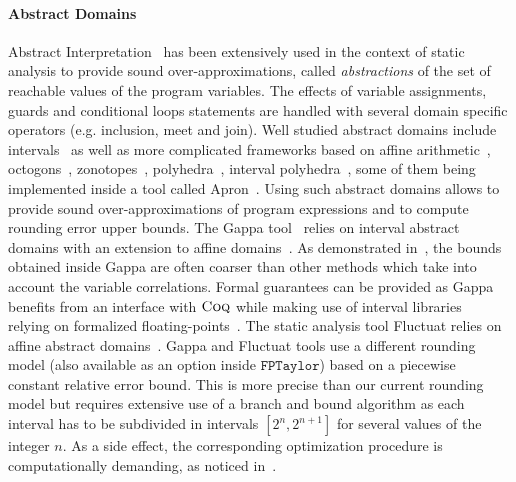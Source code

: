 \documentclass[preprint]{sigplanconf}
\newcommand{\coq}{\text{\sc Coq}}
\newcommand{\fptaylor}{\mathtt{FPTaylor}}
\theoremstyle{plain}
\begin{document}
\paragraph{Abstract Domains}
Abstract Interpretation~\cite{CousotCousot77} has been extensively used in the context of static analysis to provide sound over-approximations, called {\em abstractions} of the set of reachable values of the program variables. The effects of variable assignments, guards and conditional loops statements are handled with several domain specific operators (e.g. inclusion, meet and join). Well studied abstract domains include intervals~\cite{Moore62} as well as more complicated frameworks based on affine arithmetic~\cite{Stolfi03}, octogons~\cite{octogons}, zonotopes~\cite{Zonotope10}, polyhedra~\cite{polyhedra08}, interval polyhedra~\cite{IntervalPoly09}, some of them being implemented inside a tool called {\sc Apron}~\cite{Apron09}. Using such abstract domains allows to provide sound over-approximations of program expressions and to compute rounding error upper bounds. The {\sc Gappa} tool~\cite{Daumas10} relies on interval abstract domains with an extension to affine domains~\cite{Linderman10}. As demonstrated in~\cite{fptaylor15}, the bounds obtained inside {\sc Gappa} are often coarser than other methods which take into account the variable correlations. Formal guarantees can be provided as {\sc Gappa} benefits from an interface with $\coq$ while making use of interval libraries~\cite{Melquiond201214} relying on formalized floating-points~\cite{BM11Flocq}. The static analysis tool {\sc Fluctuat} relies on affine abstract domains~\cite{Blanchet03}. {\sc Gappa} and {\sc Fluctuat} tools use a different rounding model (also available as an option inside $\fptaylor$) based on a piecewise constant relative error bound. This is more precise than our current rounding model but requires extensive use of a branch and bound algorithm as each interval has to be subdivided in intervals $[2^n, 2^{n+1}]$ for several values of the integer $n$.  As a side effect, the corresponding optimization procedure is computationally demanding, as noticed in~\cite{fptaylor15}.
\end{document}
